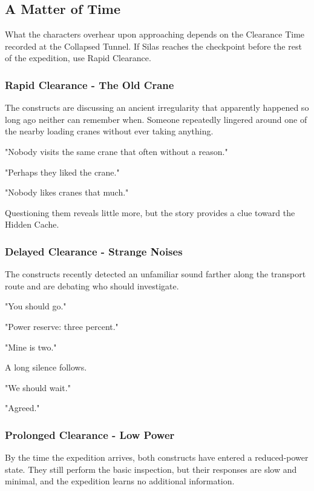 \subsection*{A Matter of Time}
{\entryfont What the characters overhear upon approaching depends on the Clearance Time recorded at the Collapsed Tunnel. If Silas reaches the checkpoint before the rest of the expedition, use Rapid Clearance.}

\subsubsection*{Rapid Clearance - The Old Crane}
{\entryfont The constructs are discussing an ancient irregularity that apparently happened so long ago neither can remember when. Someone repeatedly lingered around one of the nearby loading cranes without ever taking anything.}
\begin{DndReadAloud}
	"Nobody visits the same crane that often without a reason."

	"Perhaps they liked the crane."

	"Nobody likes cranes that much."
\end{DndReadAloud}
{\noindent\entryfont Questioning them reveals little more, but the story provides a clue toward the Hidden Cache.}
\subsubsection*{Delayed Clearance - Strange Noises}
{\entryfont The constructs recently detected an unfamiliar sound farther along the transport route and are debating who should investigate.}
\begin{DndReadAloud}
	"You should go."

	"Power reserve: three percent."

	"Mine is two."

	A long silence follows.

	"We should wait."

	"Agreed."
\end{DndReadAloud}
\subsubsection*{Prolonged Clearance - Low Power}
{\entryfont By the time the expedition arrives, both constructs have entered a reduced-power state. They still perform the basic inspection, but their responses are slow and minimal, and the expedition learns no additional information.}